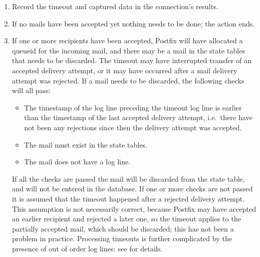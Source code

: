 \begin{enumerate}

    \item Record the timeout and captured data in the connection's results.

    \item If no mails have been accepted yet nothing needs to be done; the
         action ends.

    \item If one or more recipients have been accepted, Postfix will have
        allocated a queueid for the incoming mail, and there may be a mail
        in the state tables that needs to be discarded.  The timeout may
        have interrupted transfer of an accepted delivery attempt, or it
        may have occurred after a mail delivery attempt was rejected.  If a
        mail needs to be discarded, the following checks will all pass:

        \begin{itemize}

            \item The timestamp of the log line preceding the timeout log
                line is earlier than the timestamp of the last accepted
                delivery attempt, i.e.\ there have not been any rejections
                since then the delivery attempt was accepted.

            \item The mail must exist in the state tables.

            \item The mail does not have a  log line.

        \end{itemize}

        If all the checks are passed the mail will be discarded from the
        state table, and will not be entered in the database.  If one or
        more checks are not passed it is assumed that the timeout happened
        after a rejected delivery attempt.  This assumption is not
        necessarily correct, because Postfix may have accepted an earlier
        recipient and rejected a later one, so the timeout applies to the
        partially accepted mail, which should be discarded; this has not
        been a problem in practice.  Processing timeouts is further
        complicated by the presence of out of order  log
        lines: see  for details.

\end{enumerate}

